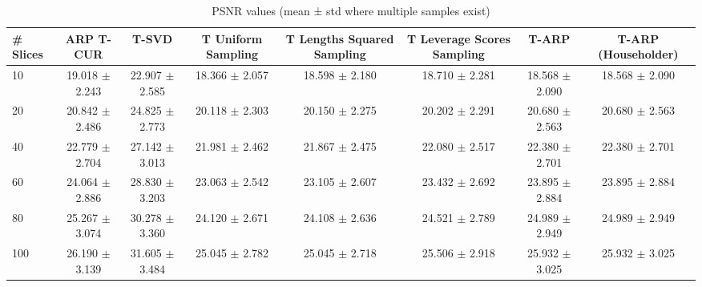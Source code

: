 \begin{table}
\caption{PSNR values (mean ± std where multiple samples exist)}
\label{tab:psnr}
\begin{tabular}{lccccccc}
\toprule
# Slices & ARP T-CUR & T-SVD & T Uniform Sampling & T Lengths Squared Sampling & T Leverage Scores Sampling & T-ARP & T-ARP (Householder) \\
\midrule
10 & 19.018 $\pm$ 2.243 & 22.907 $\pm$ 2.585 & 18.366 $\pm$ 2.057 & 18.598 $\pm$ 2.180 & 18.710 $\pm$ 2.281 & 18.568 $\pm$ 2.090 & 18.568 $\pm$ 2.090 \\
20 & 20.842 $\pm$ 2.486 & 24.825 $\pm$ 2.773 & 20.118 $\pm$ 2.303 & 20.150 $\pm$ 2.275 & 20.202 $\pm$ 2.291 & 20.680 $\pm$ 2.563 & 20.680 $\pm$ 2.563 \\
40 & 22.779 $\pm$ 2.704 & 27.142 $\pm$ 3.013 & 21.981 $\pm$ 2.462 & 21.867 $\pm$ 2.475 & 22.080 $\pm$ 2.517 & 22.380 $\pm$ 2.701 & 22.380 $\pm$ 2.701 \\
60 & 24.064 $\pm$ 2.886 & 28.830 $\pm$ 3.203 & 23.063 $\pm$ 2.542 & 23.105 $\pm$ 2.607 & 23.432 $\pm$ 2.692 & 23.895 $\pm$ 2.884 & 23.895 $\pm$ 2.884 \\
80 & 25.267 $\pm$ 3.074 & 30.278 $\pm$ 3.360 & 24.120 $\pm$ 2.671 & 24.108 $\pm$ 2.636 & 24.521 $\pm$ 2.789 & 24.989 $\pm$ 2.949 & 24.989 $\pm$ 2.949 \\
100 & 26.190 $\pm$ 3.139 & 31.605 $\pm$ 3.484 & 25.045 $\pm$ 2.782 & 25.045 $\pm$ 2.718 & 25.506 $\pm$ 2.918 & 25.932 $\pm$ 3.025 & 25.932 $\pm$ 3.025 \\
\bottomrule
\end{tabular}
\end{table}
